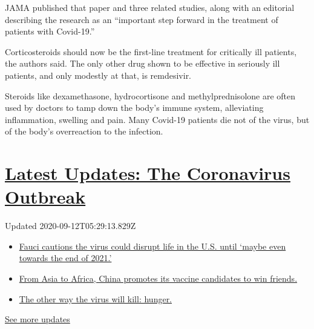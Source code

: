 JAMA published that paper and three related studies, along with an
editorial describing the research as an ``important step forward in the
treatment of patients with Covid-19.''

Corticosteroids should now be the first-line treatment for critically
ill patients, the authors said. The only other drug shown to be
effective in seriously ill patients, and only modestly at that, is
remdesivir.

Steroids like dexamethasone, hydrocortisone and methylprednisolone are
often used by doctors to tamp down the body's immune system, alleviating
inflammation, swelling and pain. Many Covid-19 patients die not of the
virus, but of the body's overreaction to the infection.

\hypertarget{latest-updates-the-coronavirus-outbreak}{%
\section{\texorpdfstring{\href{https://www.nytimes3xbfgragh.onion/2020/09/11/world/covid-19-coronavirus.html?action=click\&pgtype=Article\&state=default\&region=MAIN_CONTENT_1\&context=storylines_live_updates}{Latest
Updates: The Coronavirus
Outbreak}}{Latest Updates: The Coronavirus Outbreak}}\label{latest-updates-the-coronavirus-outbreak}}

Updated 2020-09-12T05:29:13.829Z

\begin{itemize}
\tightlist
\item
  \href{https://www.nytimes3xbfgragh.onion/2020/09/11/world/covid-19-coronavirus.html?action=click\&pgtype=Article\&state=default\&region=MAIN_CONTENT_1\&context=storylines_live_updates\#link-dfb8a16}{Fauci
  cautions the virus could disrupt life in the U.S. until `maybe even
  towards the end of 2021.'}
\item
  \href{https://www.nytimes3xbfgragh.onion/2020/09/11/world/covid-19-coronavirus.html?action=click\&pgtype=Article\&state=default\&region=MAIN_CONTENT_1\&context=storylines_live_updates\#link-7104d154}{From
  Asia to Africa, China promotes its vaccine candidates to win friends.}
\item
  \href{https://www.nytimes3xbfgragh.onion/2020/09/11/world/covid-19-coronavirus.html?action=click\&pgtype=Article\&state=default\&region=MAIN_CONTENT_1\&context=storylines_live_updates\#link-393ad215}{The
  other way the virus will kill: hunger.}
\end{itemize}

\href{https://www.nytimes3xbfgragh.onion/2020/09/11/world/covid-19-coronavirus.html?action=click\&pgtype=Article\&state=default\&region=MAIN_CONTENT_1\&context=storylines_live_updates}{See
more updates}

